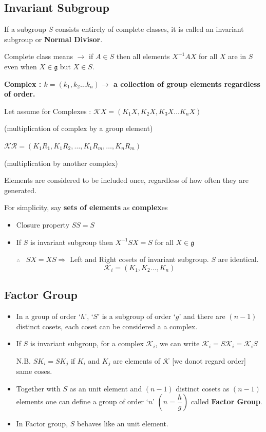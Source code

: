 \subsection*{Invariant Subgroup}

If a subgroup $S$ consists entirely of complete classes, it is called an invariant subgroup or {\bf Normal Divisor}.

Complete class means $\to$ if $A\in S$ then all elements $X^{-1}AX$ for all $X$ are in $S$ even when $X\in \mathfrak{g}$ but $X\in S$.

{\bf Complex : \boldmath$k=(k_{1},k_{2}\ldots k_{n})\to$ a collection of group elements regardless of order.}

Let assume for Complexes : $\mathcal{K}X=(K_{1}X,K_{2}X,K_{3}X\ldots K_{n}X)$

(multiplication of complex by a group element)

$\mathcal{K}\mathcal{R}=(K_{1}R_{1},K_{1}R_{2},\ldots,K_{1}R_{m},\ldots,K_{n}R_{m})$

(multiplication by another complex)

Elements are considered to be included once, regardless of how often they are generated.

\eject

For simplicity, say {\bf sets of elements} as {\bf complex}es 
\begin{itemize}
\item Closure property $SS=S$

\item If $S$ is invariant subgroup then $X^{-1}SX=S$ for all $X\in \mathfrak{g}$

$\therefore$ \ $SX=XS\Rightarrow$ Left and Right cosets of invariant subgroup. $S$ are identical.
$$
\mathcal{K}_{i}=(K_{1},K_{2}\ldots, K_{n})
$$
\end{itemize}

\subsection*{Factor Group}
\begin{itemize}
\item In a group of order `$h$', `$S$' is a subgroup of order `$g$' and there are $(n-1)$ distinct cosets, each coset can be considered a a complex.

\item If $S$ is invariant subgroup, for a complex $\mathcal{K}_{i}$, we can write $\mathcal{K}_{i}=S\mathcal{K}_{i}=\mathcal{K}_{i}S$

N.B. $SK_{i}=SK_{j}$ if $K_{i}$ and $K_{j}$ are elements of $\mathcal{K}$ [we donot regard order] same coses.

\item Together with $S$ as an unit element and $(n-1)$ distinct cosets as $(n-1)$ elements one can define a group of order `$n$' $(n=\dfrac{h}{g})$ called {\bf Factor Group}.

\item In Factor group, $S$ behaves like an unit element.
\end{itemize}

